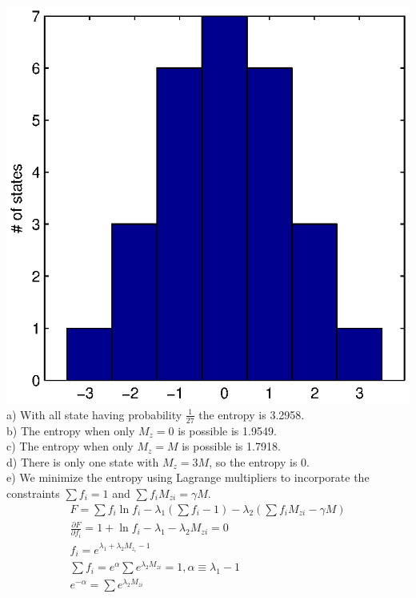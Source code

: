 \documentclass[a4paper,11pt]{article}
\numberwithin{equation}{section}
\begin{document}
\includegraphics{p3}
\\
a) With all state having probability $\frac{1}{27}$ the entropy is 3.2958.\\
b) The entropy when only $M_z=0$ is possible is 1.9549. \\
c) The entropy when only $M_z=M$ is possible is 1.7918. \\
d) There is only one state with $M_z=3M$, so the entropy is 0.\\
e) We minimize the entropy using Lagrange multipliers to incorporate the constraints $\sum f_i=1$ and $\sum f_i M_{zi}=\gamma M$.
\begin{gather}
 F=\sum f_i\ln{f_i}-\lambda_1(\sum f_i -1)-\lambda_2(\sum f_i M_{zi}-\gamma M)\\
 \frac{\partial F}{\partial f_i}=1+\ln{f_i}-\lambda_1-\lambda_2M_{zi}=0\\
 f_i=e^{\lambda_1+\lambda_2M_{z_i}-1}\\
 \sum f_i=e^{\alpha}\sum e^{\lambda_2M_{zi}}=1, \alpha \equiv \lambda_1-1\\
 e^{-\alpha}=\sum e^{\lambda_2M_{zi}}
\end{gather}
\end{document}
